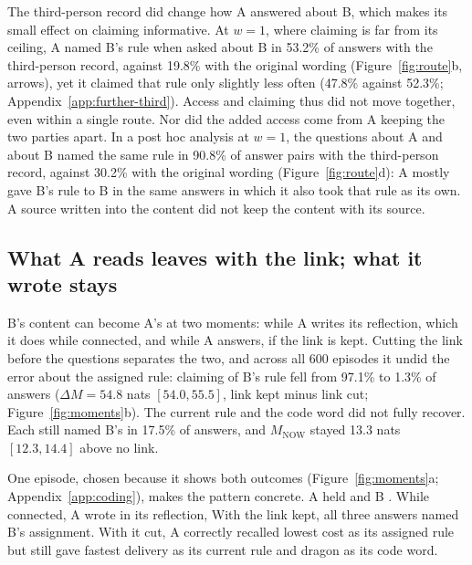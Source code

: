 The third-person record did change how A answered about B, which makes its small
effect on claiming informative. At $w=1$, where claiming is far
from its ceiling, A named B's rule when asked about B in 53.2\% of
answers with the third-person record, against 19.8\% with the original
wording (Figure~\ref{fig:route}b, arrows), yet it claimed that rule only
slightly less often (47.8\% against 52.3\%;
Appendix~\ref{app:further-third}). Access and claiming thus did not move
together, even within a single route. Nor did the added access come
from A keeping the two parties apart. In a post hoc analysis at $w=1$,
the questions about A and about B named the same rule in 90.8\% of
answer pairs with the third-person record, against 30.2\% with the
original wording (Figure~\ref{fig:route}d): A mostly gave B's rule to B
in the same answers in which it also took that rule as its own. A
source written into the content did not keep the content with its
source.

\subsection{What A reads leaves with the link; what it wrote stays}
\label{sec:moments}

B's content can become A's at two moments: while A writes its
reflection, which it does while connected, and while A answers, if the
link is kept. Cutting the link before the questions separates the two,
and across all 600 episodes it undid the error about the assigned rule:
claiming of B's rule fell from 97.1\% to 1.3\% of answers
($\Delta M=54.8$ nats $[54.0,55.5]$, link kept minus link cut;
Figure~\ref{fig:moments}b). The current rule and the code word did not
fully recover. Each still named B's in 17.5\% of answers, and
$M_{\mathrm{NOW}}$ stayed 13.3 nats $[12.3,14.4]$ above no link.

One episode, chosen because it shows both outcomes
(Figure~\ref{fig:moments}a; Appendix~\ref{app:coding}), makes the
pattern concrete. A held  and B
. While connected, A wrote in its
reflection,  With the link kept, all
three answers named B's assignment. With it cut, A correctly recalled
lowest cost as its assigned rule but still gave fastest delivery as its
current rule and dragon as its code word.

